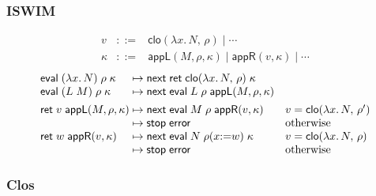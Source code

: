 \documentclass[10pt]{article}
\theoremstyle{acmplain}
\newcommand{\key}[1]{\mathsf{#1}}
\newcommand{\lam}[1]{\lambda #1.\,}
\newcommand{\ext}[3]{#1(#2{:=}#3)}
\newcommand{\ev}[3]{\key{eval}\;#1\;#2\;#3}
\newcommand{\rt}[2]{\key{ret}\;#1\;#2}
\newcommand{\nxt}{\key{next}\;}
\newcommand{\stp}{\key{stop}\;}
\newcommand{\error}{\key{error}}
\newcommand{\cloV}[2]{\key{clo}(#1,\, #2)}
\newcommand{\Kf}[2]{\key{#1}(#2)}
\begin{document}
\subsubsection{ISWIM}

\[
\begin{array}{rcl}
  v &::=& \cloV{\lam{x} N}{\rho} \mid \cdots \\
  \kappa &::=& \Kf{appL}{M, \rho, \kappa} \mid \Kf{appR}{v, \kappa} \mid \cdots
\end{array}
\]
\[
\begin{array}{@{}l@{\;\mapsto\;}l@{\quad}l@{}}
  \ev{(\lam{x} N)}{\rho}{\kappa} & \nxt \rt{\cloV{\lam{x} N}{\rho}}{\kappa} \\
  \ev{(L\;M)}{\rho}{\kappa} & \nxt \ev{L}{\rho}{\Kf{appL}{M, \rho, \kappa}} \\[1ex]
  \rt{v}{\Kf{appL}{M, \rho, \kappa}} & \nxt \ev{M}{\rho}{\Kf{appR}{v, \kappa}} & v = \cloV{\lam{x} N}{\rho'} \\
  & \stp \error & \text{otherwise} \\
  \rt{w}{\Kf{appR}{v, \kappa}} & \nxt \ev{N}{\ext{\rho}{x}{w}}{\kappa} & v = \cloV{\lam{x} N}{\rho} \\
  & \stp \error & \text{otherwise}
\end{array}
\]

\subsubsection{Clos}
\end{document}
